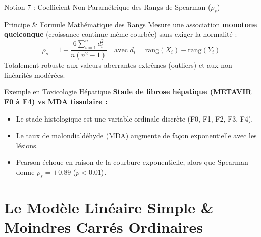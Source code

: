 \documentclass[aspectratio=169,10pt]{beamer}
\begin{document}
\begin{frame}{Notion 7 : Coefficient Non-Paramétrique des Rangs de Spearman ($\rho_s$)}
  \begin{conceptbox}{Principe \& Formule Mathématique des Rangs}
    \footnotesize
    Mesure une association \textbf{monotone quelconque} (croissance continue même courbée) sans exiger la normalité :
    \begin{equation*}
      \rho_s = 1 - \frac{6 \sum_{i=1}^n d_i^2}{n(n^2 - 1)} \quad \text{avec } d_i = \text{rang}(X_i) - \text{rang}(Y_i)
    \end{equation*}
    Totalement robuste aux valeurs aberrantes extrêmes (outliers) et aux non-linéarités modérées.
  \end{conceptbox}
  \vspace{1mm}
  \begin{biobox}{Exemple en Toxicologie Hépatique}
    \footnotesize
    \textbf{Stade de fibrose hépatique (METAVIR F0 à F4) vs MDA tissulaire :}
    \begin{itemize}
      \item Le stade histologique est une variable ordinale discrète (F0, F1, F2, F3, F4).
      \item Le taux de malondialdéhyde (MDA) augmente de façon exponentielle avec les lésions.
      \item Pearson échoue en raison de la courbure exponentielle, alors que Spearman donne $\rho_s = +0.89$ ($p < 0.01$).
    \end{itemize}
  \end{biobox}
\end{frame}

\section{Le Modèle Linéaire Simple \& Moindres Carrés Ordinaires}
\end{document}
